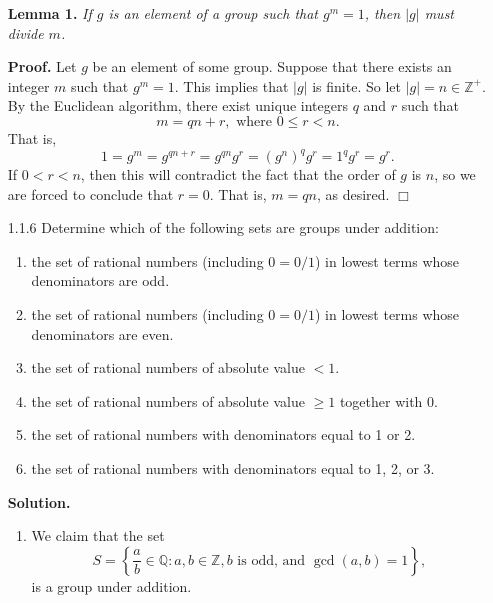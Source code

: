 \documentclass[9pt]{article}
\newcommand{\qed}{\hfill \ensuremath{\Box}}
\newcommand{\Z}{\mathbb{Z}}
\newcommand{\Q}{\mathbb{Q}}
\begin{document}
\begin{enumerate}
   \item[]        \textbf{Lemma 1.} \textit{If $g$ is an element of a group
                  such that $g^m = 1$, then $|g|$ must divide $m$.}

                  \textbf{Proof.} Let $g$ be an element of some group. Suppose
                  that there exists an integer $m$ such that $g^m = 1$. This
                  implies that $|g|$ is finite. So let $|g| = n \in \Z^+$. By
                  the Euclidean algorithm, there exist unique integers $q$ and
                  $r$ such that
                  $$m = qn + r, \text{ where } 0 \le r < n.$$
                  That is,
                  $$1 = g^m = g^{qn + r} = g^{qn}g^r = (g^n)^qg^r =1^qg^r=g^r.$$
                  If $0 < r < n$, then this will contradict the fact that the
                  order of $g$ is $n$, so we are forced to conclude that
                  $r = 0$. That is, $m = qn$, as desired. \qed
   \item[1.1.6]   Determine which of the following sets are groups under
                  addition:
                  \begin{enumerate}
                     \item the set of rational numbers (including $0 = 0/1$) in
                           lowest terms whose denominators are odd.
                     \item the set of rational numbers (including $0 = 0/1$) in
                           lowest terms whose denominators are even.
                     \item the set of rational numbers of absolute value $< 1$.
                     \item the set of rational numbers of absolute value $\ge 1$
                           together with 0.
                     \item the set of rational numbers with denominators equal
                           to 1 or 2.
                     \item the set of rational numbers with denominators equal
                           to 1, 2, or 3.
                  \end{enumerate}

      \textbf{Solution.}

      \begin{enumerate}
         \item We claim that the set
               $$S = \left\{\frac{a}{b} \in \Q : a, b \in \Z, b \text{ is odd,} 
                        \text{ and } \gcd(a, b) = 1\right\},$$
               is a group under addition.


\end{enumerate}
\end{enumerate}
\end{document}
